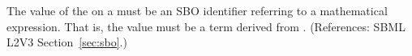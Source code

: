 The value of the   on a \Trigger must be an SBO
identifier referring to a mathematical expression.  That is, the value
must be a term derived from \sbomathformula.  (References: SBML
L2V3 Section~\ref{sec:sbo}.)
